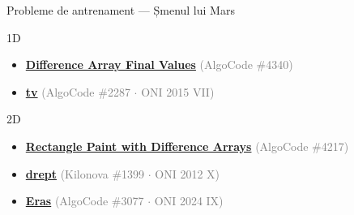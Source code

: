 \documentclass{beamer}
\begin{document}
\begin{frame}{Probleme de antrenament — Șmenul lui Mars}
  \begin{block}{1D}
    \begin{itemize}\footnotesize\itemsep0pt
      \item \href{https://code.algolymp.com/problems/4340}{\textbf{Difference Array Final Values}} \textcolor{gray}{(AlgoCode \#4340)}
      \item \href{https://code.algolymp.com/problems/2287}{\textbf{tv}} \textcolor{gray}{(AlgoCode \#2287 $\cdot$ ONI 2015 VII)}
    \end{itemize}
  \end{block}
  \vspace{-4pt}
  \begin{block}{2D}
    \begin{itemize}\footnotesize\itemsep0pt
      \item \href{https://code.algolymp.com/problems/4217}{\textbf{Rectangle Paint with Difference Arrays}} \textcolor{gray}{(AlgoCode \#4217)}
      \item \href{https://kilonova.ro/problems/1399}{\textbf{drept}} \textcolor{gray}{(Kilonova \#1399 $\cdot$ ONI 2012 X)}
      \item \href{https://code.algolymp.com/problems/3077}{\textbf{Eras}} \textcolor{gray}{(AlgoCode \#3077 $\cdot$ ONI 2024 IX)}
    \end{itemize}
  \end{block}
\end{frame}
\end{document}
